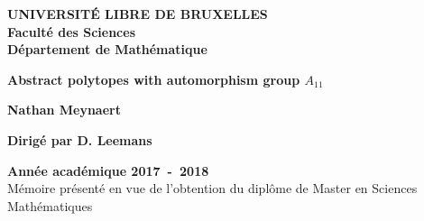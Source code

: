 \begin{titlepage}

  \centering

  \textbf{UNIVERSITÉ LIBRE DE BRUXELLES}\\
  \textbf{Faculté des Sciences}\\
  \textbf{Département de Mathématique}

  \vfill

  \textbf{\Large Abstract polytopes with automorphism group $A_{11}$}

  \vfill

  \textbf{\Large Nathan Meynaert}

  \vfill

  \textbf{Dirigé par D. Leemans}

  \vfill

  \textbf{Année académique 2017~-~2018}\\
  Mémoire présenté en vue de l'obtention du diplôme de Master en Sciences Mathématiques

\end{titlepage}
